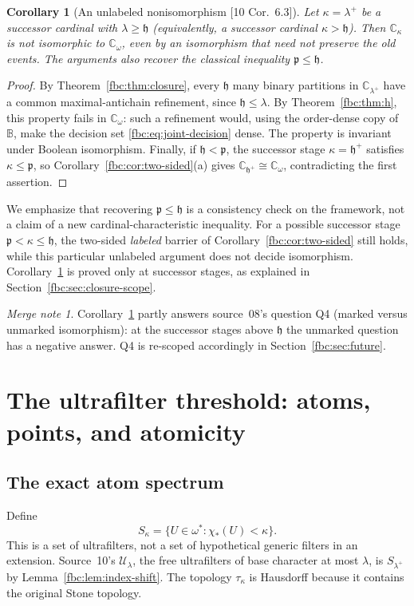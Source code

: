 \documentclass[11pt,letterpaper]{article}
\newtheorem{corollary}[theorem]{Corollary}
\theoremstyle{definition}
\theoremstyle{remark}
\newtheorem*{mergenote}{Merge note}
\newcommand{\om}{\omega}
\newcommand{\B}{\mathbb B}
\newcommand{\C}{\mathbb C}
\newcommand{\cp}{\mathfrak p}
\newcommand{\ch}{\mathfrak h}
\newcommand{\src}[1]{\textup{[#1]}}
\begin{document}
\begin{corollary}[An unlabeled nonisomorphism \src{10 Cor.~6.3}]
\label{fbc:cor:abstract}
Let $\kappa=\lambda^+$ be a successor cardinal with $\lambda\geq\ch$
(equivalently, a successor cardinal $\kappa>\ch$). Then $\C_\kappa$ is
not isomorphic to $\C_\om$, even by an isomorphism that need not preserve
the old events. The arguments also recover the classical inequality
$\cp\leq\ch$.
\end{corollary}
\begin{proof}
By Theorem~\ref{fbc:thm:closure}, every $\ch$ many binary partitions in
$\C_{\lambda^+}$ have a common maximal-antichain refinement, since
$\ch\leq\lambda$. By Theorem~\ref{fbc:thm:h}, this property fails in
$\C_\om$: such a refinement would, using the order-dense copy of $\B$,
make the decision set \eqref{fbc:eq:joint-decision} dense. The property
is invariant under Boolean isomorphism. Finally, if $\ch<\cp$, the
successor stage $\kappa=\ch^+$ satisfies $\kappa\leq\cp$, so
Corollary~\ref{fbc:cor:two-sided}\textup{(a)} gives $\C_{\ch^+}\cong\C_\om$,
contradicting the first assertion.
\end{proof}

We emphasize that recovering $\cp\leq\ch$ is a consistency check on
the framework, not a claim of a new cardinal-characteristic inequality.
For a possible successor stage $\cp<\kappa\leq\ch$, the two-sided
\emph{labeled} barrier of Corollary~\ref{fbc:cor:two-sided} still holds,
while this particular unlabeled argument does not decide isomorphism.
Corollary~\ref{fbc:cor:abstract} is proved only at successor stages, as
explained in Section~\ref{fbc:sec:closure-scope}.

\begin{mergenote}
Corollary~\ref{fbc:cor:abstract} partly answers source~08's question Q4
(marked versus unmarked isomorphism): at the successor stages above
$\ch$ the unmarked question has a negative answer. Q4 is re-scoped
accordingly in Section~\ref{fbc:sec:future}.
\end{mergenote}

\section{The ultrafilter threshold: atoms, points, and atomicity}
\label{fbc:sec:atoms}

\subsection{The exact atom spectrum}
Define
\[
 S_\kappa=\{U\in\om^*:\chi_*(U)<\kappa\}.
\]
This is a set of ultrafilters, not a set of hypothetical generic filters
in an extension. Source~10's $\mathcal U_\lambda$, the free ultrafilters
of base character at most $\lambda$, is $S_{\lambda^+}$ by
Lemma~\ref{fbc:lem:index-shift}. The topology $\tau_\kappa$ is Hausdorff
because it contains the original Stone topology.
\end{document}

